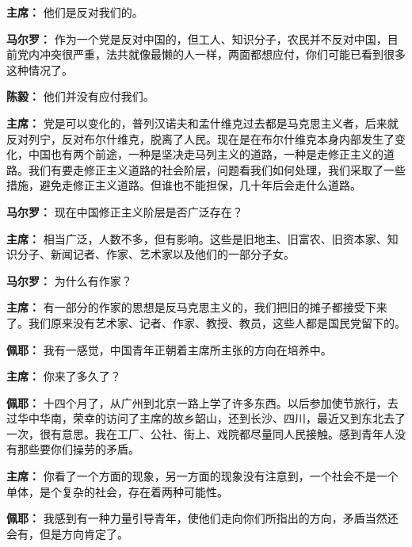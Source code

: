 \begin{list}{}
\item[\textbf{主席：}] 他们是反对我们的。

\item[\textbf{马尔罗：}] 作为一个党是反对中国的，但工人、知识分子，农民并不反对中国，目前党内冲突很严重，法共就像最懒的人一样，两面都想应付，你们可能已看到很多这种情况了。

\item[\textbf{陈毅：}] 他们并没有应付我们。

\item[\textbf{主席：}] 党是可以变化的，普列汉诺夫和孟什维克过去都是马克思主义者，后来就反对列宁，反对布尔什维克，脱离了人民。现在是在布尔什维克本身内部发生了变化，中国也有两个前途，一种是坚决走马列主义的道路，一种是走修正主义的道路。我们有要走修正主义道路的社会阶层，问题看我们如何处理，我们采取了一些措施，避免走修正主义道路。但谁也不能担保，几十年后会走什么道路。

\item[\textbf{马尔罗：}] 现在中国修正主义阶层是否广泛存在？

\item[\textbf{主席：}] 相当广泛，人数不多，但有影响。这些是旧地主、旧富农、旧资本家、知识分子、新闻记者、作家、艺术家以及他们的一部分子女。

\item[\textbf{马尔罗：}] 为什么有作家？

\item[\textbf{主席：}] 有一部分的作家的思想是反马克思主义的，我们把旧的摊子都接受下来了。我们原来没有艺术家、记者、作家、教授、教员，这些人都是国民党留下的。

\item[\textbf{佩耶：}] 我有一感觉，中国青年正朝着主席所主张的方向在培养中。

\item[\textbf{主席：}] 你来了多久了？

\item[\textbf{佩耶：}] 十四个月了，从广州到北京一路上学了许多东西。以后参加使节旅行，去过华中华南，荣幸的访问了主席的故乡韶山，还到长沙、四川，最近又到东北去了一次，很有意思。我在工厂、公社、街上、戏院都尽量同人民接触。感到青年人没有那些要你们操劳的矛盾。

\item[\textbf{主席：}] 你看了一个方面的现象，另一方面的现象没有注意到，一个社会不是一个单体，是个复杂的社会，存在着两种可能性。

\item[\textbf{佩耶：}] 我感到有一种力量引导青年，使他们走向你们所指出的方向，矛盾当然还会有，但是方向肯定了。


\end{list}

